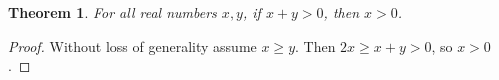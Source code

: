 \documentclass{article}
\newtheorem{theorem}{Theorem}
\begin{document}
\begin{theorem}\label{thm:bad-wlog}
For all real numbers $x,y$, if $x+y>0$, then $x>0$.
\end{theorem}
\begin{proof}
Without loss of generality assume $x\ge y$. Then
$2x\ge x+y>0$, so $x>0$.
\end{proof}
\end{document}
